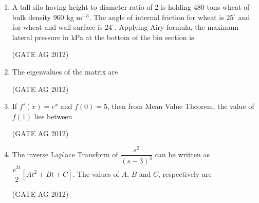 \documentclass[journal]{IEEEtran}
\begin{document}
\begin{enumerate}
\medskip

\item
 A tall silo having height to diameter ratio of 2 is holding 480 tons wheat of bulk density $960$ kg m$^{-3}$. The angle of internal friction for wheat is $25^\circ$ and for wheat and wall surface is $24^\circ$. Applying Airy formula, the maximum lateral pressure in kPa at the bottom of the bin section is
\begin{enumerate}
\end{enumerate}
\hfill(GATE AG 2012)\\

\medskip


\noindent
\item
The eigenvalues of the matrix
are
\begin{enumerate}
\end{enumerate}
\hfill(GATE AG 2012)\\

\medskip


\item
 If $f'(x) = e^x$ and $f(0)=5$, then from Mean Value Theorem, the value of $f(1)$ lies between
\begin{enumerate}
\end{enumerate}
\hfill(GATE AG 2012)\\

\medskip

\item
 The inverse Laplace Transform of $\dfrac{s^2}{(s-3)^3}$ can be written as $\dfrac{e^{3t}}{2}[A t^2+Bt+C]$. The values of $A$, $B$ and $C$, respectively are
\begin{enumerate}
\end{enumerate}
\hfill(GATE AG 2012)\\


\end{enumerate}
\end{document}
